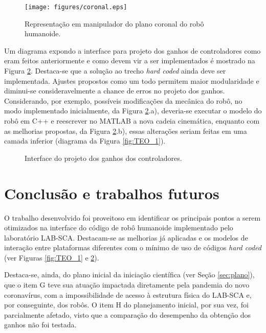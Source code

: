 \begin{figure}
\centering
\texttt{[image: figures/coronal.eps]}
\caption{Representação em manipulador do plano coronal do robô humanoide.}
\label{fig:coronal}
\end{figure}

Um diagrama expondo a interface para projeto dos ganhos de controladores como eram feitos anteriormente e como devem vir a ser implementados é mostrado na Figura \ref{fig:ganhos}. Destaca-se que a solução ao trecho \textit{hard coded} ainda deve ser implementada. Ajustes propostos como um todo permitem maior modularidade e diminui-se consideravelmente a chance de erros no projeto dos ganhos. Considerando, por exemplo, possíveis modificações da mecânica do robô, no modo implementado inicialmente, da Figura \ref{fig:ganhos}.a), deveria-se executar o modelo do robô em C++ e reescrever no MATLAB a nova cadeia cinemática, enquanto com as melhorias propostas, da Figura \ref{fig:ganhos}.b), essas alterações seriam feitas em uma camada inferior (diagrama da Figura \ref{fig:TEO_1}).

\begin{figure}
    \centering
    
    
    
    \caption{Interface do projeto dos ganhos dos controladores.}
    \label{fig:ganhos}
\end{figure}

\section{Conclusão e trabalhos futuros}

O trabalho desenvolvido foi proveitoso em identificar os principais pontos a serem otimizados na interface do código de robô humanoide implementado pelo laboratório LAB-SCA. Destacam-se as melhorias já aplicadas e os modelos de interação entre plataformas diferentes com o mínimo de uso de códigos \textit{hard coded} (ver Figuras \ref{fig:TEO_1} e \ref{fig:ganhos}).

Destaca-se, ainda, do plano inicial da iniciação científica (ver Seção \ref{sec:plano}), que o item G teve sua atuação impactada diretamente pela pandemia do novo coronavírus, com a impossibilidade de acesso à estrutura física do LAB-SCA e, por conseguinte, dos robôs. O item H do planejamento inicial, por sua vez, foi parcialmente afetado, visto que a comparação do desempenho da obtenção dos ganhos não foi testada.

